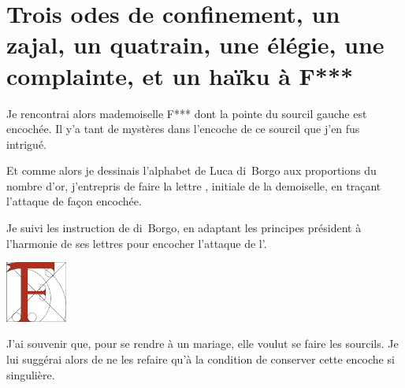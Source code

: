 \afterpage{}
\section*{Trois odes de confinement, un zajal, un quatrain, une élégie, une complainte, et un haïku à F***}

\begin{prose}
Je rencontrai alors mademoiselle F*** dont la pointe du sourcil gauche est encochée. Il y’a tant de mystères dans l’encoche de ce sourcil que j’en fus intrigué.

Et comme alors je dessinais l’alphabet de Luca di~Borgo aux proportions du nombre d’or, j’entrepris de faire la lettre , initiale de la demoiselle, en traçant l’attaque de façon encochée.

Je suivi les instruction de di~Borgo, en adaptant les principes président à l’harmonie de ses lettres pour encocher l’attaque de l’.
\end{prose}


\begin{center}
\includegraphics[height=2cm]{F.pdf}
\end{center}


\begin{prose}
J’ai souvenir que, pour se rendre à un mariage, elle voulut se faire les sourcils. Je lui suggérai alors de ne les refaire qu’à la condition de conserver cette encoche si singulière.
\end{prose}

